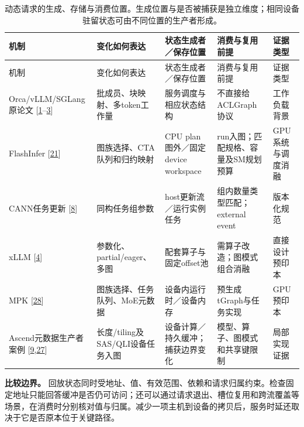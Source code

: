 \documentclass[
  UTF8,
  zihao=5]{ctexart}
\begin{document}
\begin{longtable}[]{@{}
  >{\raggedright\arraybackslash}p{}
  >{\raggedright\arraybackslash}p{}
  >{\raggedright\arraybackslash}p{}
  >{\raggedright\arraybackslash}p{}
  >{\raggedright\arraybackslash}p{}@{}}
\caption{动态请求的生成、存储与消费位置。生成位置与是否被捕获是独立维度；相同设备驻留状态可由不同位置的生产者形成。}\tabularnewline
\toprule
机制 & 变化如何表达 & 状态生成者／保存位置 & 消费与复用前提 &
证据类型 \\
\midrule
\endfirsthead
\toprule
机制 & 变化如何表达 & 状态生成者／保存位置 & 消费与复用前提 &
证据类型 \\
\midrule
\endhead
Orca/vLLM/SGLang原论文
{[}\protect\hyperlink{ref-yu2022orca}{1}--\protect\hyperlink{ref-zheng2024sglang}{3}{]}
& 批成员、块映射、多token工作量 & 服务调度与相应状态结构 &
不直接给ACLGraph协议 & 工作负载背景 \\
FlashInfer {[}\protect\hyperlink{ref-ye2025flashinfer}{21}{]} &
图族选择、CTA队列和归约映射 & CPU plan图外／固定device workspace &
run入图；匹配规格、容量及SM规划预算 & GPU系统与调度消融 \\
CANN任务更新 {[}\protect\hyperlink{ref-cann910update}{8}{]} &
同构任务组参数 & host更新流／运行实例任务 & 组内数量类型匹配；external
event & 版本化规范 \\
xLLM {[}\protect\hyperlink{ref-liu2025xllm}{4}{]} &
参数化、partial/eager、多图 & 配套算子与固定offset池 &
需算子改造；图模式组合消融 & 直接设计预印本 \\
MPK {[}\protect\hyperlink{ref-cheng2026mpk}{28}{]} &
图族选择、任务队列、MoE元数据 & 设备内运行时／设备内存 &
预生成tGraph与任务实现 & GPU预印本 \\
Ascend元数据生产者案例
{[}\protect\hyperlink{ref-vllmascendpr21259}{9},\protect\hyperlink{ref-vllmascendpr21281}{27}{]}
& 长度/tiling及SAS/QLI设备任务入图 & 设备计算／持久缓冲；捕获边界变化 &
模型、算子、图模式和共享键限制 & 局部实现证据 \\
\bottomrule
\end{longtable}

\textbf{比较边界。}
回放状态同时受地址、值、有效范围、依赖和请求归属约束。检查固定地址只能回答缓冲是否仍可访问；还可以通过请求退出、槽位复用和跨流覆盖等场景，在消费时分别核对值与归属。减少一项主机到设备的拷贝后，服务时延还取决于它是否原本位于关键路径。
\end{document}
